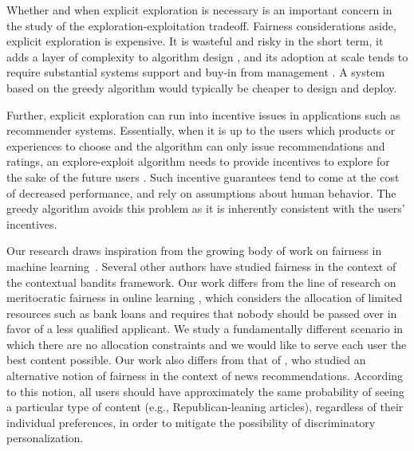 Whether and when explicit exploration is necessary is an important concern in the study of the exploration-exploitation tradeoff. Fairness considerations aside, explicit exploration is expensive. It is wasteful and risky in the short term, it adds a layer of complexity to algorithm design \citep{Langford-nips07,monster-icml14}, and its adoption at scale tends to require substantial systems support and buy-in from management \citep{MWT-WhitePaper-2016,DS-arxiv}. A system based on the greedy algorithm would typically be cheaper to design and deploy.

Further, explicit exploration can run into incentive issues in applications such as recommender systems. Essentially, when it is up to the users which products or experiences to choose and the algorithm can only issue recommendations and ratings, an explore-exploit algorithm needs to provide incentives to explore for the sake of the future users \citep{Kremer-JPE14,Frazier-ec14,Che-13,ICexploration-ec15,Bimpikis-exploration-ms17}. Such incentive guarantees tend to come at the cost of decreased performance, and rely on assumptions about human behavior. The greedy algorithm avoids this problem as it is inherently consistent with the users' incentives.



Our research draws inspiration from the growing body of work on fairness in machine learning~\cite[e.g.,][]{dwork2012fairness,hardt2016equality,kleinberg2017inherent,chouldechova2017fair}.  Several other authors have studied fairness in the context of the contextual bandits framework.  Our work differs from the line of research on meritocratic fairness in online learning \citep{kearns2017meritocratic,liu2017calibrated,joseph2016fairness}, which considers the allocation of limited resources such as bank loans and requires that nobody should be passed over in favor of a less qualified applicant. We study a fundamentally different scenario in which there are no allocation constraints and we would like to serve each user the best content possible.  Our work also differs from that of \citet{celis2017fair}, who studied an alternative notion of fairness in the context of news recommendations. According to this notion, all users should have approximately the same probability of seeing a particular type of content (e.g., Republican-leaning articles), regardless of their individual preferences, in order to mitigate the possibility of discriminatory personalization.

